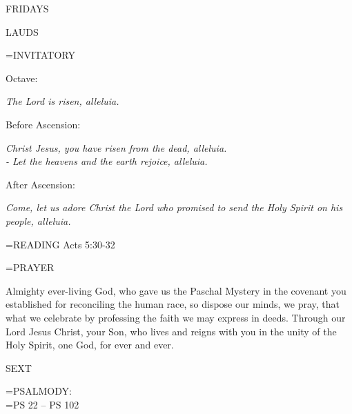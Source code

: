 \begin{center}\normalsize FRIDAYS\\
\end{center}

\begin{flushleft}\normalsize LAUDS\\\end{flushleft}

\hangindent=\parindent \small{INVITATORY}
\begin{center}
\end{center}Octave:\begin{center}\textit{	The Lord is risen, alleluia.\\}
\end{center}Before Ascension:\begin{center}\textit{	Christ Jesus, you have risen from the dead, alleluia.\\}
\textit{- Let the heavens and the earth rejoice, alleluia.\\}
\end{center}After Ascension:\begin{center}\textit{	Come, let us adore Christ the Lord who promised to send the Holy Spirit on his people, alleluia.\\}
\end{center}

\hangindent=\parindent \small{\uppercase{READING}}    Acts 5:30-32 \textbf{   \\}

\hangindent=\parindent \small PRAYER
\begin{description}[labelindent=\parindent, leftmargin=*]
\item [Before Ascension:] 	Almighty ever-living God, who gave us the Paschal Mystery in the covenant you established for reconciling the human race, so dispose our minds, we pray, that what we celebrate by professing the faith we may express in deeds. Through our Lord Jesus Christ, your Son, who lives and reigns with you in the unity of the Holy Spirit, one God, for ever and ever.
\item [After Ascension:] 	
\end{description}

\begin{flushleft}\normalsize SEXT\\\end{flushleft}

\hangindent=\parindent \small{PSALMODY:}\\
\hangindent=\parindent  PS 22 -- PS 102\vspace{0.5em}

